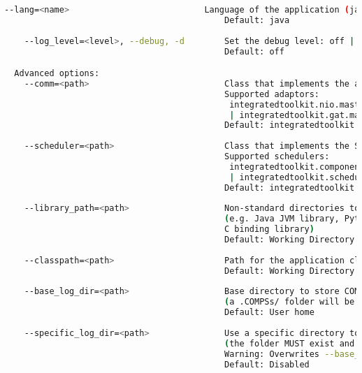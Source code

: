 \begin{lstlisting}[language=bash]
    --lang=<name>                           Language of the application (java/c/python)
                                            Default: java
                                            
    --log_level=<level>, --debug, -d        Set the debug level: off | info | debug
                                            Default: off

  Advanced options:
    --comm=<path>                           Class that implements the adaptor for communications
                                            Supported adaptors: 
                                             integratedtoolkit.nio.master.NIOAdaptor
                                             | integratedtoolkit.gat.master.GATAdaptor
                                            Default: integratedtoolkit.nio.master.NIOAdaptor
                                            
    --scheduler=<path>                      Class that implements the Scheduler for COMPSs
                                            Supported schedulers: 
                                             integratedtoolkit.components.impl.TaskScheduler 
                                             | integratedtoolkit.scheduler.readyscheduler.ReadyScheduler
                                            Default: integratedtoolkit.scheduler.readyscheduler.ReadyScheduler
                                            
    --library_path=<path>                   Non-standard directories to search for libraries 
                                            (e.g. Java JVM library, Python library, 
                                            C binding library)
                                            Default: Working Directory
                                            
    --classpath=<path>                      Path for the application classes / modules
                                            Default: Working Directory
                                            
    --base_log_dir=<path>                   Base directory to store COMPSs log files 
                                            (a .COMPSs/ folder will be created inside this location)
                                            Default: User home
                                            
    --specific_log_dir=<path>               Use a specific directory to store COMPSs log files 
                                            (the folder MUST exist and no sandbox is created)
                                            Warning: Overwrites --base_log_dir option
                                            Default: Disabled
                                            

\end{lstlisting}
